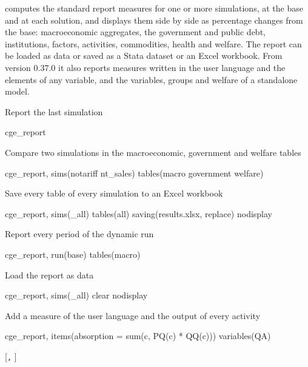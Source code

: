 

 computes the standard report measures for one or more
simulations, at the base and at each solution, and displays them side by side
as percentage changes from the base: macroeconomic aggregates, the government
and public debt, institutions, factors, activities, commodities, health and
welfare. The report can be loaded as data or saved as a Stata dataset or an
Excel workbook. From version 0.37.0 it also reports measures written in the
user language and the elements of any variable, and the variables, groups
and welfare of a standalone model.


Report the last simulation
\begin{stcode}
cge_report
\end{stcode}
Compare two simulations in the macroeconomic, government and welfare tables
\begin{stcode}
cge_report, sims(notariff nt_sales) tables(macro government welfare)
\end{stcode}
Save every table of every simulation to an Excel workbook
\begin{stcode}
cge_report, sims(_all) tables(all) saving(results.xlsx, replace) nodisplay
\end{stcode}
Report every period of the dynamic run 
\begin{stcode}
cge_report, run(base) tables(macro)
\end{stcode}
Load the report as data
\begin{stcode}
cge_report, sims(_all) clear nodisplay
\end{stcode}
Add a measure of the user language and the output of every activity
\begin{stcode}
cge_report, items(absorption = sum(c, PQ(c) * QQ(c))) variables(QA)
\end{stcode}


\begin{stsyntax}
 [\texttt{,} ]
\end{stsyntax}

